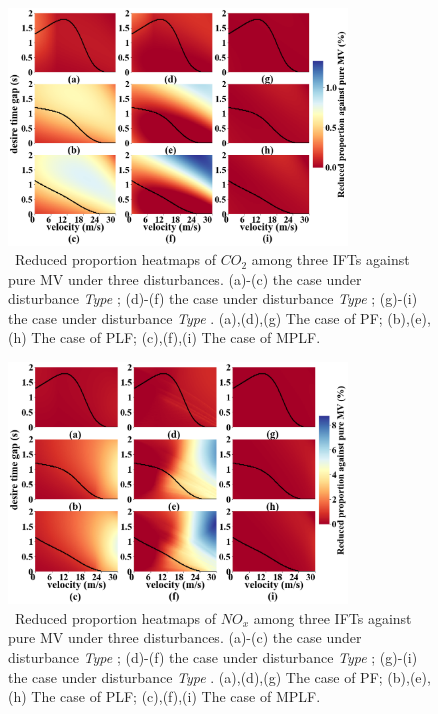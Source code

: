 \documentclass[journal]{IEEEtran}
\begin{document}
\begin{figure}
\includegraphics[width=9cm]{fig5.4_1.png}
\caption{~Reduced proportion heatmaps of $CO_2$ among three IFTs against pure MV under three disturbances. (a)-(c) the case under disturbance \textit{Type \uppercase\expandafter{}}; (d)-(f) the case under disturbance \textit{Type \uppercase\expandafter{}}; (g)-(i) the case under disturbance \textit{Type \uppercase\expandafter{}}. (a),(d),(g) The case of PF; (b),(e),(h) The case of PLF; (c),(f),(i) The case of MPLF.} 
\label{fig5.4_1}
\end{figure}

\begin{figure}
  \includegraphics[width=9cm]{fig5.4_2.png}
  \caption{~Reduced proportion heatmaps of $NO_x$ among three IFTs against pure MV under three disturbances. (a)-(c) the case under disturbance \textit{Type \uppercase\expandafter{}}; (d)-(f) the case under disturbance \textit{Type \uppercase\expandafter{}}; (g)-(i) the case under disturbance \textit{Type \uppercase\expandafter{}}. (a),(d),(g) The case of PF; (b),(e),(h) The case of PLF; (c),(f),(i) The case of MPLF.} 
  \label{fig5.4_2}
\end{figure}
\end{document}
